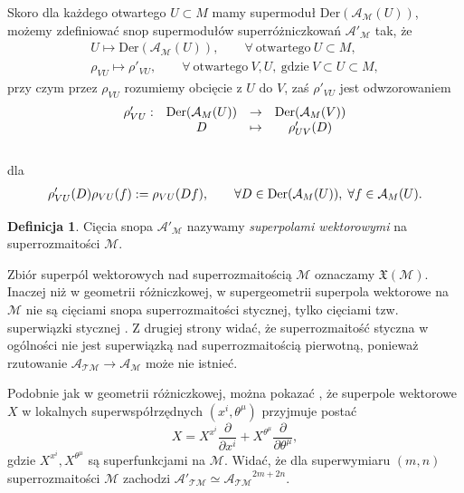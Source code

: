 \documentclass[11pt,a4paper]{report}
\theoremstyle{definition}
\newtheorem{definition}[theorem]{Definicja}
\begin{document}
Skoro dla każdego otwartego $U \subset M$ mamy supermoduł $\mathrm{Der}(\mathcal{A}_\mathcal{M}(U))$, możemy zdefiniować snop supermodułów superróżniczkowań $\mathcal{A'}_{\mathcal{M}}$ tak, że
\begin{equation}
\begin{gathered}
 U \mapsto \mathrm{Der}(\mathcal{A}_\mathcal{M}(U)), \qquad \forall \ \mathrm{otwartego}\ U \subset M, \\
 \rho_{VU} \mapsto \rho'_{VU}, \qquad \forall \ \mathrm{otwartego}\ V, U, \ \mathrm{gdzie\ } V \subset U \subset M,
\end{gathered}
\end{equation}
przy czym przez $\rho_{VU}$ rozumiemy obcięcie z $U$ do $V$, zaś $\rho'_{VU}$ jest odwzorowaniem
\begin{equation}
\begin{array}{rccc}
\rho'_{VU}: & {\rm Der}(\mathcal{A}_M(U)) & \rightarrow & {\rm Der}(\mathcal{A}_M(V)) \\
& D & \mapsto & \rho'_{UV}(D)
\end{array}
\end{equation} \\[-13pt]
dla
\begin{equation*}
\begin{aligned}
\rho'_{VU}(D) \rho_{VU}(f) := \rho_{VU}(Df),
\qquad \forall D\in {\rm Der}(\mathcal{A}_M(U)),\; \forall f\in \mathcal{A}_M(U).
\end{aligned}
\end{equation*}

\begin{definition}
Cięcia snopa $\mathcal{A'_{M}}$ nazywamy \textit{superpolami wektorowymi} na superrozmaitości $\mathcal{M}$. 
\end{definition}

Zbiór superpól wektorowych nad superrozmaitością $\mathcal M$ oznaczamy $\mathfrak{X}(\mathcal{M})$. Inaczej niż w geometrii różniczkowej, w supergeometrii superpola wektorowe na $\mathcal{M}$ nie są cięciami snopa superrozmaitości stycznej, tylko cięciami tzw. superwiązki stycznej \cite{carinena}. Z drugiej strony widać, że superrozmaitość styczna w ogólności nie jest superwiązką nad superrozmaitością pierwotną, ponieważ rzutowanie $\mathcal{A_{TM}} \rightarrow \mathcal{A_M}$ może nie istnieć.

Podobnie jak w geometrii różniczkowej, można pokazać \cite{rogers}, że superpole wektorowe $X$ w lokalnych superwspółrzędnych $(x^i, \theta^\mu)$ przyjmuje postać \\[-5pt]
\begin{equation*}
 X = X^{x^i} \frac{\partial}{\partial x^i} + X^{\theta^\mu} \frac{\partial}{\partial \theta^\mu},
\end{equation*}
gdzie $X^{x^i}, X^{\theta^\mu}$ są superfunkcjami na $\mathcal{M}$. Widać, że dla superwymiaru $(m,n)$ superrozmaitości $\mathcal{M}$ zachodzi $\mathcal{A'_{TM}} \simeq \mathcal{A_{TM}}^{2m+2n}$.
\end{document}
